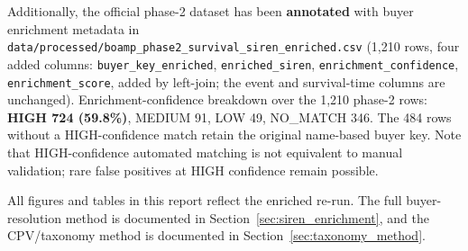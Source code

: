 \documentclass[12pt, a4paper]{article}
\begin{document}
Additionally, the official phase-2 dataset has been \textbf{annotated} with
buyer enrichment metadata in
\nolinkurl{data/processed/boamp_phase2_survival_siren_enriched.csv}
(1,210 rows, four added columns: \texttt{buyer\_key\_enriched},
\texttt{enriched\_siren}, \texttt{enrichment\_confidence},
\texttt{enrichment\_score}, added by left-join; the event and survival-time
columns are unchanged).
Enrichment-confidence breakdown over the 1,210 phase-2 rows:
\textbf{HIGH 724 (59.8\%)}, MEDIUM 91, LOW 49, NO\_MATCH 346.
The 484 rows without a HIGH-confidence match retain the original name-based
buyer key. Note that HIGH-confidence automated matching is not equivalent to
manual validation; rare false positives at HIGH confidence remain possible.

All figures and tables in this report reflect the enriched re-run. The full
buyer-resolution method is documented in Section~\ref{sec:siren_enrichment},
and the CPV/taxonomy method is documented in
Section~\ref{sec:taxonomy_method}.
\end{document}

